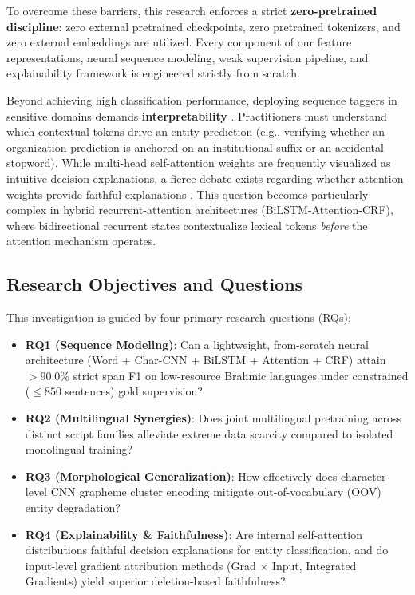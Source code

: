 \documentclass[default,iicol]{sn-jnl}
\begin{document}
To overcome these barriers, this research enforces a strict \textbf{zero-pretrained discipline}: zero external pretrained checkpoints, zero pretrained tokenizers, and zero external embeddings are utilized. Every component of our feature representations, neural sequence modeling, weak supervision pipeline, and explainability framework is engineered strictly from scratch.

Beyond achieving high classification performance, deploying sequence taggers in sensitive domains demands \textbf{interpretability} \cite{jacovi2020towards}. Practitioners must understand which contextual tokens drive an entity prediction (e.g., verifying whether an organization prediction is anchored on an institutional suffix or an accidental stopword). While multi-head self-attention weights are frequently visualized as intuitive decision explanations, a fierce debate exists regarding whether attention weights provide faithful explanations \cite{jain2019attention,wiegreffe2019attention,serrano2019attention,bastings2020elephant}. This question becomes particularly complex in hybrid recurrent-attention architectures (BiLSTM-Attention-CRF), where bidirectional recurrent states contextualize lexical tokens \textit{before} the attention mechanism operates.

\subsection{Research Objectives and Questions}
This investigation is guided by four primary research questions (RQs):
\begin{itemize}
    \item \textbf{RQ1 (Sequence Modeling)}: Can a lightweight, from-scratch neural architecture (Word + Char-CNN + BiLSTM + Attention + CRF) attain $>90.0\%$ strict span F1 on low-resource Brahmic languages under constrained ($\le 850$ sentences) gold supervision?
    \item \textbf{RQ2 (Multilingual Synergies)}: Does joint multilingual pretraining across distinct script families alleviate extreme data scarcity compared to isolated monolingual training?
    \item \textbf{RQ3 (Morphological Generalization)}: How effectively does character-level CNN grapheme cluster encoding mitigate out-of-vocabulary (OOV) entity degradation?
    \item \textbf{RQ4 (Explainability \& Faithfulness)}: Are internal self-attention distributions faithful decision explanations for entity classification, and do input-level gradient attribution methods (Grad $\times$ Input, Integrated Gradients) yield superior deletion-based faithfulness?
\end{itemize}
\end{document}
